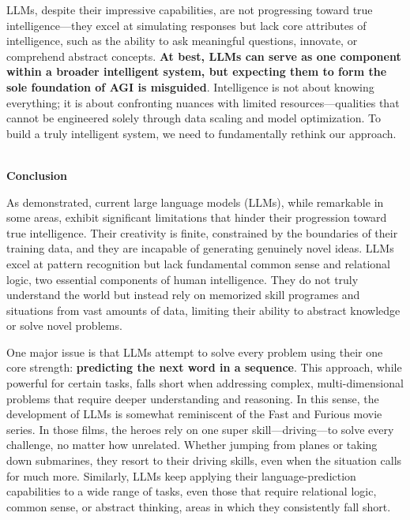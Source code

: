 \documentclass[11pt]{scrartcl}
\begin{document}
LLMs, despite their impressive capabilities, are not progressing toward true intelligence—they excel at simulating responses but lack core attributes of intelligence, such as the ability to ask meaningful questions, innovate, or comprehend abstract concepts. \textbf{At best, LLMs can serve as one component within a broader intelligent system, but expecting them to form the sole foundation of AGI is misguided}. Intelligence is not about knowing everything; it is about confronting nuances with limited resources—qualities that cannot be engineered solely through data scaling and model optimization. To build a truly intelligent system, we need to fundamentally rethink our approach. \\ \\

\vspace{1cm}

\begin{huge}
\textbf{Conclusion}
\end{huge}
As demonstrated, current large language models (LLMs), while remarkable in some areas, exhibit significant limitations that hinder their progression toward true intelligence. Their creativity is finite, constrained by the boundaries of their training data, and they are incapable of generating genuinely novel ideas. LLMs excel at pattern recognition but lack fundamental common sense and relational logic, two essential components of human intelligence. They do not truly understand the world but instead rely on memorized skill programes and situations from vast amounts of data, limiting their ability to abstract knowledge or solve novel problems.

One major issue is that LLMs attempt to solve every problem using their one core strength: \textbf{predicting the next word in a sequence}. This approach, while powerful for certain tasks, falls short when addressing complex, multi-dimensional problems that require deeper understanding and reasoning. In this sense, the development of LLMs is somewhat reminiscent of the Fast and Furious movie series. In those films, the heroes rely on one super skill—driving—to solve every challenge, no matter how unrelated. Whether jumping from planes or taking down submarines, they resort to their driving skills, even when the situation calls for much more. Similarly, LLMs keep applying their language-prediction capabilities to a wide range of tasks, even those that require relational logic, common sense, or abstract thinking, areas in which they consistently fall short.
\end{document}
